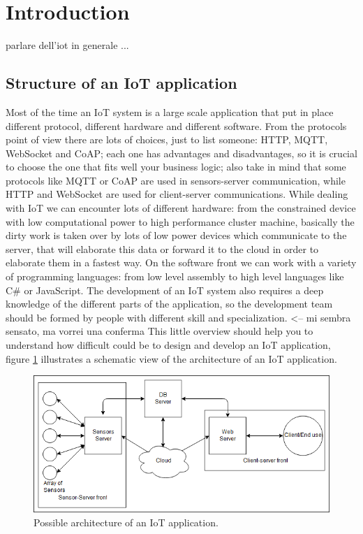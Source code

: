 	\section{Introduction}
	parlare dell'iot in generale ...
	
	\subsection{Structure of an IoT application}
	Most of the time an IoT system is a large scale application that put in place different protocol, different hardware
	and different software.\newline
	From the protocols point of view there are lots of choices, just to list someone: HTTP, MQTT, WebSocket and CoAP;
	each one has advantages and disadvantages, so it is crucial to choose the one that fits well your business logic; also take in mind
	that some protocols like MQTT or CoAP are used in sensors-server communication, while HTTP and WebSocket
	are used for client-server communications.\newline
	While dealing with IoT we can encounter lots of different hardware: from the constrained device with low computational power to
	high performance cluster machine, basically the dirty work is taken over by lots of low power devices which communicate to the server,
	that will elaborate this data or forward it to the cloud in order to elaborate them in a fastest way.\newline
	On the software front we can work with a variety of programming languages: from low level assembly to high level languages like C\# or JavaScript.\newline
	The development of an IoT system also requires a deep knowledge of the different parts of the application, so the development team
	should be formed by people with different skill and specialization. <-- mi sembra sensato, ma vorrei una conferma\newline
	This little overview should help you to understand how difficult could be to design and develop an IoT application, figure \ref{fig:intro0} illustrates 
	a schematic view of the architecture of an IoT application.\newline
	
	\begin{figure}
		\includegraphics[width=\linewidth]{intro-000.png}
		\caption{Possible architecture of an IoT application.}
		\label{fig:intro0}
	\end{figure}
	
